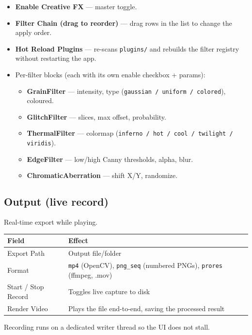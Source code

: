 \documentclass[11pt,a4paper,openany]{report}
\begin{document}
\begin{itemize}
    \item \textbf{Enable Creative FX} --- master toggle.
    \item \textbf{Filter Chain (drag to reorder)} --- drag rows in the list
        to change the apply order.
    \item \textbf{Hot Reload Plugins} --- re-scans \texttt{plugins/} and
        rebuilds the filter registry without restarting the app.
    \item Per-filter blocks (each with its own enable checkbox + params):
    \begin{itemize}
        \item \textbf{GrainFilter} --- intensity, type
            (\texttt{gaussian / uniform / colored}), coloured.
        \item \textbf{GlitchFilter} --- slices, max offset, probability.
        \item \textbf{ThermalFilter} --- colormap (\texttt{inferno / hot /
            cool / twilight / viridis}).
        \item \textbf{EdgeFilter} --- low/high Canny thresholds, alpha, blur.
        \item \textbf{ChromaticAberration} --- shift X/Y, randomize.
    \end{itemize}
\end{itemize}

\subsection{Output (live record)}
Real-time export while playing.

\begin{tabularx}{\linewidth}{@{}lX@{}}
    \toprule
    \textbf{Field} & \textbf{Effect} \\
    \midrule
    Export Path    & Output file/folder \\
    Format         & \texttt{mp4} (OpenCV), \texttt{png\_seq} (numbered PNGs), \texttt{prores} (ffmpeg, .mov) \\
    Start / Stop Record & Toggles live capture to disk \\
    Render Video   & Plays the file end-to-end, saving the processed result \\
    \bottomrule
\end{tabularx}

\begin{btnote}
Recording runs on a dedicated writer thread so the UI does not stall.
\end{btnote}
\end{document}

